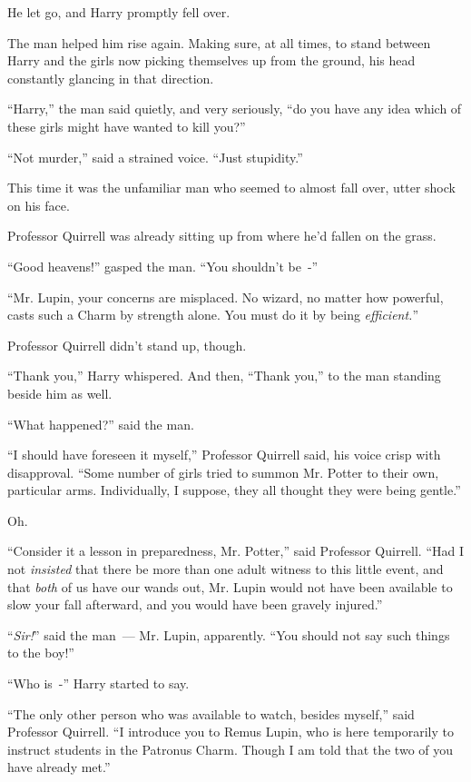 He let go, and Harry promptly fell over.

The man helped him rise again. Making sure, at all times, to stand between Harry and the girls now picking themselves up from the ground, his head constantly glancing in that direction.

``Harry,'' the man said quietly, and very seriously, ``do you have any idea which of these girls might have wanted to kill you?''

``Not murder,'' said a strained voice. ``Just stupidity.''

This time it was the unfamiliar man who seemed to almost fall over, utter shock on his face.

Professor Quirrell was already sitting up from where he'd fallen on the grass.

``Good heavens!'' gasped the man. ``You shouldn't be~-''

``Mr. Lupin, your concerns are misplaced. No wizard, no matter how powerful, casts such a Charm by strength alone. You must do it by being \emph{efficient.}''

Professor Quirrell didn't stand up, though.

``Thank you,'' Harry whispered. And then, ``Thank you,'' to the man standing beside him as well.

``What happened?'' said the man.

``I should have foreseen it myself,'' Professor Quirrell said, his voice crisp with disapproval. ``Some number of girls tried to summon Mr. Potter to their own, particular arms. Individually, I suppose, they all thought they were being gentle.''

Oh.

``Consider it a lesson in preparedness, Mr. Potter,'' said Professor Quirrell. ``Had I not \emph{insisted} that there be more than one adult witness to this little event, and that \emph{both} of us have our wands out, Mr. Lupin would not have been available to slow your fall afterward, and you would have been gravely injured.''

``\emph{Sir!}'' said the man~--- Mr. Lupin, apparently. ``You should not say such things to the boy!''

``Who is~-'' Harry started to say.

``The only other person who was available to watch, besides myself,'' said Professor Quirrell. ``I introduce you to Remus Lupin, who is here temporarily to instruct students in the Patronus Charm. Though I am told that the two of you have already met.''

